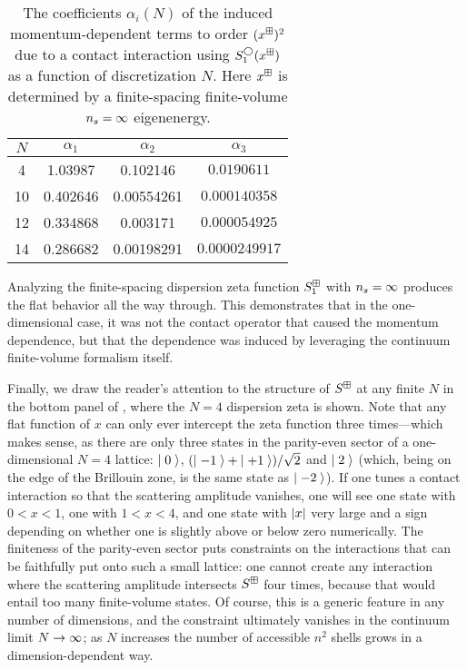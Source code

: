 \begin{table}
    \caption{
    The coefficients $\alpha_i(N)$ of the induced momentum-dependent terms to order $(x^\boxplus)^2$ due to a contact interaction using $S^\bigcirc_1(x^\boxplus)$ as a function of discretization $N$.
    Here $x^\boxplus$ is determined by a finite-spacing finite-volume ${n_s}=\infty$ eigenenergy.}
    \label{tab:induced terms in 1 d}
    \begin{tabular}{c|ccc}
    $N$ & $\alpha_1$ & $\alpha_2$ & $\alpha_3$\\
                \hline
      4 &    1.03987& 0.102146 & $0.0190611$\\
    10  &   0.402646 & 0.00554261 & $ 0.000140358$    \\
    12  &   0.334868 & 0.003171 &$ 0.000054925$    \\
    14  &   0.286682 & 0.00198291 &$0.0000249917$    \\
    \end{tabular}
\end{table}


Analyzing the finite-spacing dispersion zeta function $S^{\boxplus}_1$ with ${n_s}=\infty$ produces the flat behavior all the way through.
This demonstrates that in the one-dimensional case, it was not the contact operator that caused the momentum dependence, but that the dependence was induced by leveraging the continuum finite-volume formalism itself.

Finally, we draw the reader's attention to the structure of $S^\boxplus$ at any finite $N$ in the bottom panel of , where the $N=4$ dispersion zeta is shown.
Note that any flat function of $x$ can only ever intercept the zeta function three times---which makes sense, as there are only three states in the parity-even sector of a one-dimensional $N=4$ lattice: $\left|\;0\;\right\rangle$, $(\left|\;-1\;\right\rangle+\left|\;+1\;\right\rangle)/\sqrt{2}$ and $\left|\;2\;\right\rangle$ (which, being on the edge of the Brillouin zone, is the same state as $\left|\;-2\;\right\rangle$).
If one tunes a contact interaction so that the scattering amplitude vanishes, one will see one state with $0<x<1$, one with $1<x<4$, and one state with $\left| x \right|$ very large and a sign depending on whether one is slightly above or below zero numerically.
The finiteness of the parity-even sector puts constraints on the interactions that can be faithfully put onto such a small lattice: one cannot create any interaction where the scattering amplitude intersects $S^{\boxplus}$ four times, because that would entail too many finite-volume states.
Of course, this is a generic feature in any number of dimensions, and the constraint ultimately vanishes in the continuum limit $N\rightarrow\infty$; as $N$ increases the number of accessible $n^2$ shells grows in a dimension-dependent way.
